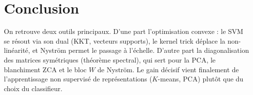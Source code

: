 \documentclass[11pt,a4paper]{article}
\begin{document}
\section{Conclusion}
On retrouve deux outils principaux. D'une part l'optimisation convexe : le SVM se
résout via son dual (KKT, vecteurs supports), le kernel trick déplace la
non-linéarité, et Nyström permet le passage à l'échelle. D'autre part la
diagonalisation des matrices symétriques (théorème spectral), qui sert pour la PCA,
le blanchiment ZCA et le bloc $W$ de Nyström. Le gain décisif vient finalement de
l'apprentissage non supervisé de représentations ($K$-means, PCA) plutôt que du
choix du classifieur.
\end{document}
